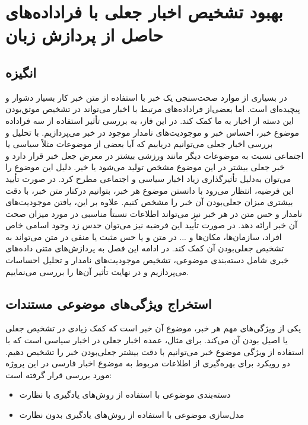 \chapter{بهبود تشخیص اخبار جعلی با فراداده‌های حاصل از پردازش زبان}
\section{انگیزه}
در بسیاری از موارد  صحت‌سنجی یک خبر با استفاده از متن خبر کار بسیار دشوار و پیچیده‌ای است. اما بعضی‌از فراداده‌های مرتبط با اخبار می‌تواند در تشخیص موثق‌بودن این دسته از اخبار به ما کمک کند. در این فاز، به بررسی تأثیر استفاده از سه فراداده موضوع خبر، احساس خبر و موجودیت‌های نامدار موجود در خبر می‌پردازیم. با تحلیل و بررسی اخبار جعلی می‌توانیم دریابیم که آیا بعضی از موضوعات مثلاً سیاسی یا اجتماعی نسبت ‌به موضوعات دیگر مانند ورزشی بیشتر در معرض جعل خبر قرار دارد و خبر جعلی بیشتر در این موضوع مشخص تولید می‌شود یا خیر. دلیل این موضوع را می‌توان به‌دلیل تأثیرگذاری زیاد اخبار سیاسی و اجتماعی مطرح کرد. در صورت تأیید این فرضیه، انتظار می‌رود با دانستن موضوع هر خبر، بتوانیم درکنار متن خبر، با دقت بیشتری میزان جعلی‌بودن آن خبر را مشخص کنیم. علاوه بر این، یافتن موجودیت‌های نامدار و حس متن در هر خبر نیز می‌تواند اطلاعات نسبتاً مناسبی در مورد میزان صحت آن خبر ارائه دهد. در صورت تأیید این فرضیه نیز می‌توان حدس زد وجود اسامی خاص افراد، سازمان‌ها، مکان‌ها و ... در متن و یا حس مثبت یا منفی در متن می‌تواند به تشخیص جعلی‌بودن آن کمک کند. در ادامه این فصل به پردازش‌های متنی داده‌های خبری شامل دسته‌بندی موضوعی، تشخیص موجودیت‌های نامدار و تحلیل احساسات می‌پردازیم و در نهایت تأثیر آن‌ها را بررسی می‌نماییم.

\section{استخراج ویژگی‌های موضوعی مستندات}
یکی از ویژگی‌های مهم هر خبر، موضوع آن خبر است که کمک زیادی در تشخیص جعلی یا اصیل بودن آن‌ می‌کند. برای مثال، عمده اخبار جعلی در اخبار سیاسی است که با استفاده از ویژگی موضوع خبر می‌توانیم با دقت بیشتر جعلی‌بودن خبر را تشخیص دهیم. دو رویکرد برای بهره‌گیری از اطلاعات مربوط به موضوع اخبار فارسی در این پروژه مورد بررسی قرار گرفته است:
\begin{itemize}
	\item دسته‌بندی موضوعی با استفاده از روش‌های یادگیری با نظارت
	\item مدل‌سازی موضوعی با استفاده از روش‌های یادگیری بدون ‌نظارت
\end{itemize}


